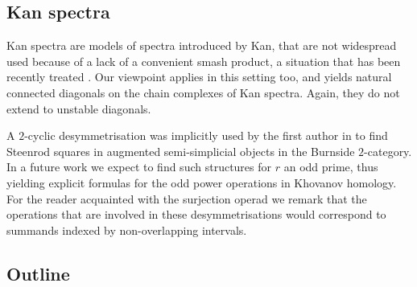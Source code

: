

\subsection{Kan spectra}

Kan spectra \cite{Kan1963} are models of spectra introduced by Kan, that are not widespread used because of a lack of a convenient smash product, a situation that has been recently treated \cite{CKP2023}.
Our viewpoint applies in this setting too, and yields natural connected diagonals on the chain complexes of Kan spectra.
Again, they do not extend to unstable diagonals.


A $2$-cyclic desymmetrisation was implicitly used by the first author in \cite{cantero-moran2020khovanov} to find Steenrod squares in augmented semi-simplicial objects in the Burnside $2$-category.
In a future work we expect to find such structures for $r$ an odd prime, thus yielding explicit formulas for the odd power operations in Khovanov homology.
For the reader acquainted with the surjection operad we remark that the operations that are involved in these desymmetrisations would correspond to summands indexed by non-overlapping intervals.

\subsection{Outline}

